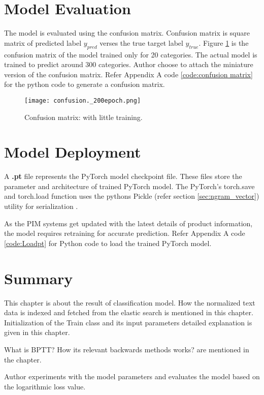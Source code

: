 \section{Model Evaluation}

The model is evaluated using the confusion matrix. Confusion matrix is square matrix of predicted label $y_{pred}$ verses the true target label $y_{true}$.
Figure \ref{fig:meval} is the confusion matrix of the model trained only for 20 categories. The actual model is trained to predict around 300 categories. Author choose to attach the miniature version of the confusion matrix.  Refer Appendix A code \ref{code:confusion matrix} for the python code to generate a confusion matrix.

\begin{figure}[H]
    \centering    
    \texttt{[image: confusion.\_200epoch.png]}
    \caption{Confusion matrix: with little training.
    }
    \label{fig:meval}
\end{figure}

\section{Model Deployment}

A \textbf{.pt} file represents the PyTorch model checkpoint file. These files store the parameter and architecture of trained PyTorch model. The PyTorch's torch.save and torch.load function uses the pythons  Pickle (refer section \ref{sec:ngram_vector}) utility for serialization \parencite{savept}.

As the \acl{PIM} systems get updated with the latest details of product information, the model requires retraining for accurate prediction. Refer Appendix A code \ref{code:Loadpt} for Python code to load the trained PyTorch model.

\section{Summary}

This chapter is about the result of classification model. How the normalized text data is indexed and fetched from the elastic search is mentioned in this chapter. Initialization of the Train class and its input parameters detailed explanation is given in this chapter.  

What is \acf*{BPTT}? How its relevant backwards methods works? are mentioned in the chapter.

Author experiments with the model parameters and evaluates the model based on the logarithmic loss value. 

